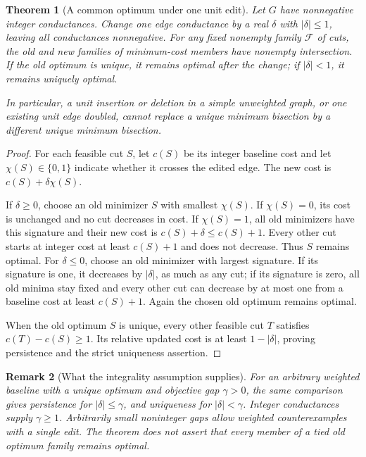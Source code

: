 \documentclass[11pt]{article}
\newtheorem{theorem}{Theorem}
\newtheorem{remark}[theorem]{Remark}
\begin{document}
\begin{theorem}[A common optimum under one unit edit]\label{thm:one}
Let $G$ have nonnegative integer conductances. Change one edge conductance
by a real $\delta$ with $|\delta|\le1$, leaving all conductances
nonnegative. For any fixed nonempty family $\mathcal F$ of cuts, the old
and new families of minimum-cost members have nonempty intersection.
If the old optimum is unique, it remains optimal after the change;
if $|\delta|<1$, it remains uniquely optimal.

In particular, a unit insertion or deletion in a simple unweighted graph,
or one existing unit edge doubled, cannot replace a unique minimum
bisection by a different unique minimum bisection.
\end{theorem}
\begin{proof}
For each feasible cut $S$, let $c(S)$ be its integer baseline cost and
let $\chi(S)\in\{0,1\}$ indicate whether it crosses the edited edge.
The new cost is $c(S)+\delta\chi(S)$.

If $\delta\ge0$, choose an old minimizer $S$ with smallest $\chi(S)$.
If $\chi(S)=0$, its cost is unchanged and no cut decreases in cost.
If $\chi(S)=1$, all old minimizers have this signature and their new
cost is $c(S)+\delta\le c(S)+1$. Every other cut starts at integer cost
at least $c(S)+1$ and does not decrease. Thus $S$ remains optimal.
For $\delta\le0$, choose an old minimizer with largest signature.
If its signature is one, it decreases by $|\delta|$, as much as any cut;
if its signature is zero, all old minima stay fixed and every other cut
can decrease by at most one from a baseline cost at least $c(S)+1$.
Again the chosen old optimum remains optimal.

When the old optimum $S$ is unique, every other feasible cut $T$ satisfies
$c(T)-c(S)\ge1$. Its relative updated cost is at least
$1-|\delta|$, proving persistence and the strict uniqueness assertion.
\end{proof}

\begin{remark}[What the integrality assumption supplies]
For an arbitrary weighted baseline with a unique optimum and objective
gap $\gamma>0$, the same comparison gives persistence for
$|\delta|\le\gamma$, and uniqueness for $|\delta|<\gamma$. Integer
conductances supply $\gamma\ge1$. Arbitrarily small noninteger gaps allow
weighted counterexamples with a single edit. The theorem does not assert
that every member of a tied old optimum family remains optimal.
\end{remark}
\end{document}
